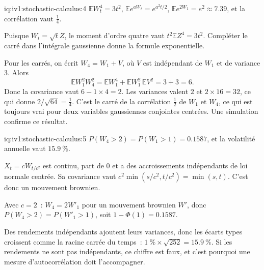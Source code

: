 \begin{solution}{iq:iv1:stochastic-calculus:4}
$\mathbb{E}W_t^4 = 3t^2$, $\mathbb{E}e^{aW_t} = e^{a^2t/2}$, $\mathbb{E}e^{2W_1} = e^2 \approx 7.39$, et la corrélation vaut $\frac14$.

Puisque $W_t = \sqrt{t}Z$, le moment d'ordre quatre vaut $t^2\mathbb{E}Z^4 = 3t^2$. Compléter le carré dans l'intégrale gaussienne donne la formule exponentielle.

Pour les carrés, on écrit $W_4 = W_1 + V$, où $V$ est indépendant de $W_1$ et de variance 3. Alors
\[
\mathbb{E}W_1^2W_4^2 = \mathbb{E}W_1^4 + \mathbb{E}W_1^2\,\mathbb{E}V^2 = 3 + 3 = 6.
\]
Donc la covariance vaut $6 - 1 \times 4 = 2$. Les variances valent $2$ et $2 \times 16 = 32$, ce qui donne $2/\sqrt{64} = \frac14$. C'est le carré de la corrélation $\frac12$ de $W_1$ et $W_4$, ce qui est toujours vrai pour deux variables gaussiennes conjointes centrées. Une simulation confirme ce résultat.



\end{solution}

\enlargethispage{-3\baselineskip}%
\begin{solution}{iq:iv1:stochastic-calculus:5}
$P(W_4 > 2) = P(W_1 > 1) = 0.1587$, et la volatilité annuelle vaut $15.9~\%$.

$X_t = cW_{t/c^2}$ est continu, part de 0 et a des accroissements indépendants de loi normale centrée. Sa covariance vaut $c^2\min(s/c^2, t/c^2) = \min(s, t)$. C'est donc un mouvement brownien.

Avec $c = 2$~: $W_4 = 2W'_1$ pour un mouvement brownien $W'$, donc $P(W_4 > 2) = P(W'_1 > 1)$, soit $1 - \Phi(1) = 0.1587$.

Des rendements indépendants ajoutent leurs variances, donc les écarts types croissent comme la racine carrée du temps~: $1~\% \times \sqrt{252} = 15.9~\%$. Si les rendements ne sont pas indépendants, ce chiffre est faux, et c'est pourquoi une mesure d'autocorrélation doit l'accompagner.



\end{solution}

